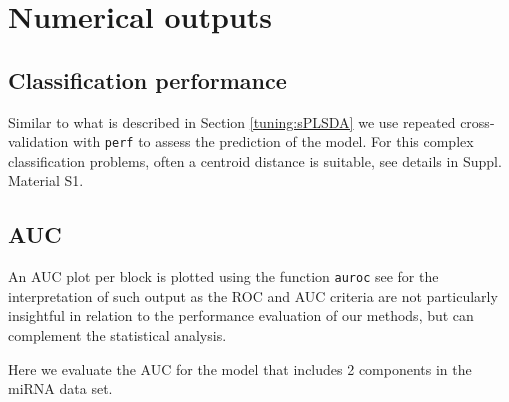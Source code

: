 \documentclass[]{book}
\newenvironment{Shaded}{\begin{snugshade}}{\end{snugshade}}
\newcommand{\CommentTok}[1]{\textcolor[rgb]{0.56,0.35,0.01}{\textit{#1}}}
\newcommand{\DataTypeTok}[1]{\textcolor[rgb]{0.13,0.29,0.53}{#1}}
\newcommand{\DecValTok}[1]{\textcolor[rgb]{0.00,0.00,0.81}{#1}}
\newcommand{\KeywordTok}[1]{\textcolor[rgb]{0.13,0.29,0.53}{\textbf{#1}}}
\newcommand{\NormalTok}[1]{#1}
\newcommand{\StringTok}[1]{\textcolor[rgb]{0.31,0.60,0.02}{#1}}
\begin{document}
\hypertarget{numerical-outputs}{%
\section{Numerical outputs}\label{numerical-outputs}}

\hypertarget{classification-performance}{%
\subsection{Classification performance}\label{classification-performance}}

Similar to what is described in Section \ref{tuning:sPLSDA} we use repeated cross-validation with \texttt{perf} to assess the prediction of the model. For this complex classification problems, often a centroid distance is suitable, see details in \citep{mixomics} Suppl. Material S1.

\begin{Shaded}
\end{Shaded}

\hypertarget{auc}{%
\subsection{AUC}\label{auc}}

An AUC plot per block is plotted using the function \texttt{auroc} see \citep{mixomics} for the interpretation of such output as the ROC and AUC criteria are not particularly insightful in relation to the performance evaluation of our methods, but can complement the statistical analysis.

Here we evaluate the AUC for the model that includes 2 components in the miRNA data set.
\end{document}
